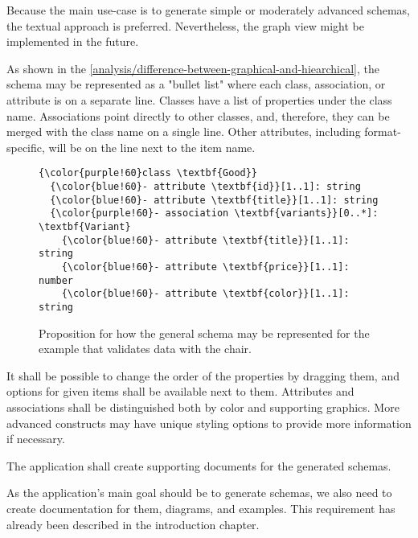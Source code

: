 Because the main use-case is to generate simple or moderately advanced schemas, the textual approach is preferred. Nevertheless, the graph view might be implemented in the future.

\medskip

As shown in the \autoref{analysis/difference-between-graphical-and-hiearchical}, the schema may be represented as a "bullet list" where each class, association, or attribute is on a separate line. Classes have a list of properties under the class name. Associations point directly to other classes, and, therefore, they can be merged with the class name on a single line. Other attributes, including format-specific, will be on the line next to the item name.

\begin{figure}[h!]\centering
  \begin{Verbatim}[commandchars=\\\{\}]
{\color{purple!60}class \textbf{Good}}
  {\color{blue!60}- attribute \textbf{id}}[1..1]: string
  {\color{blue!60}- attribute \textbf{title}}[1..1]: string
  {\color{purple!60}- association \textbf{variants}}[0..*]: \textbf{Variant}
    {\color{blue!60}- attribute \textbf{title}}[1..1]: string
    {\color{blue!60}- attribute \textbf{price}}[1..1]: number
    {\color{blue!60}- attribute \textbf{color}}[1..1]: string
\end{Verbatim}
  \caption{Proposition for how the general schema may be represented for the example that validates data with the chair.}
  \label{analysis/general-schema-representation}
\end{figure}

It shall be possible to change the order of the properties by dragging them, and options for given items shall be available next to them. Attributes and associations shall be distinguished both by color and supporting graphics. More advanced constructs may have unique styling options to provide more information if necessary.



\begin{requirement}
    The application shall create supporting documents for the generated schemas.
\end{requirement}

As the application's main goal should be to generate schemas, we also need to create documentation for them, diagrams, and examples. This requirement has already been described in the introduction chapter.


